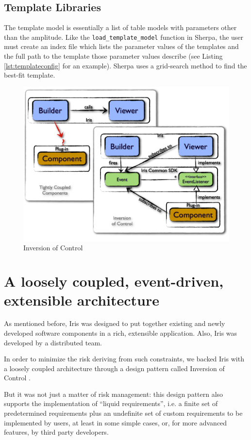 \documentclass[preprint,12pt,3p]{elsarticle}
\begin{document}
\subsection{Template Libraries}
The template model is essentially a list of table models with parameters other than the amplitude. Like the \texttt{load\_template\_model} function in Sherpa, the user must create an index file which lists the parameter values of the templates and the full path to the template those parameter values describe (see Listing \ref{lst:templateconfig} for an example). Sherpa uses a grid-search method to find the best-fit template.

\begin{figure}[h!]
\begin{center}
\includegraphics[width=0.7\columnwidth]{figures/IrisDiagrams.002/IrisDiagrams.002.png}
\caption{Inversion of Control}
\end{center}
\end{figure}

\section{A loosely coupled, event-driven, extensible architecture}
\label{sec:architecture}

As mentioned before, Iris was designed to put together existing and newly developed software components in a rich, extensible application. Also, Iris was developed by a distributed team.

In order to minimize the risk deriving from such constraints, we backed Iris with a loosely coupled architecture through a design pattern called Inversion of Control \citep*{ioc}.

But it was not just a matter of risk management: this design pattern also supports the implementation of ``liquid requirements'', i.e. a finite set of predetermined requirements plus an undefinite set of custom requirements to be implemented by users, at least in some simple cases, or, for more advanced features, by third party developers.
\end{document}
